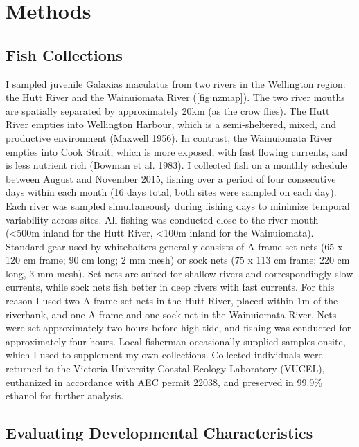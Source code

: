 \documentclass[]{book}
\begin{document}
\section{Methods}\label{methods}

\subsection{Fish Collections}\label{fish-collections}

I sampled juvenile Galaxias maculatus from two rivers in the Wellington
region: the Hutt River and the Wainuiomata River (\ref{fig:nzmap}). The
two river mouths are spatially separated by approximately 20km (as the
crow flies). The Hutt River empties into Wellington Harbour, which is a
semi-sheltered, mixed, and productive environment (Maxwell 1956). In
contrast, the Wainuiomata River empties into Cook Strait, which is more
exposed, with fast flowing currents, and is less nutrient rich (Bowman
et al. 1983). I collected fish on a monthly schedule between August and
November 2015, fishing over a period of four consecutive days within
each month (16 days total, both sites were sampled on each day). Each
river was sampled simultaneously during fishing days to minimize
temporal variability across sites. All fishing was conducted close to
the river mouth (\textless{}500m inland for the Hutt River,
\textless{}100m inland for the Wainuiomata). Standard gear used by
whitebaiters generally consists of A-frame set nets (65 x 120 cm frame;
90 cm long; 2 mm mesh) or sock nets (75 x 113 cm frame; 220 cm long, 3
mm mesh). Set nets are suited for shallow rivers and correspondingly
slow currents, while sock nets fish better in deep rivers with fast
currents. For this reason I used two A-frame set nets in the Hutt River,
placed within 1m of the riverbank, and one A-frame and one sock net in
the Wainuiomata River. Nets were set approximately two hours before high
tide, and fishing was conducted for approximately four hours. Local
fisherman occasionally supplied samples onsite, which I used to
supplement my own collections. Collected individuals were returned to
the Victoria University Coastal Ecology Laboratory (VUCEL), euthanized
in accordance with AEC permit 22038, and preserved in 99.9\% ethanol for
further analysis.

\subsection{Evaluating Developmental
Characteristics}\label{evaluating-developmental-characteristics}
\end{document}

